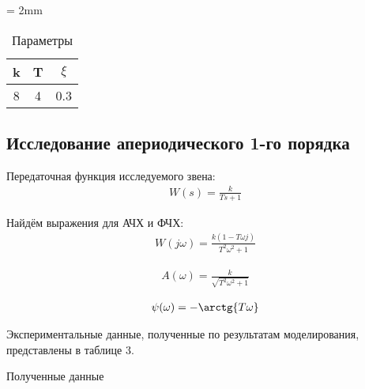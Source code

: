 \documentclass[a4paper, 12pt]{article}
\begin{document}
\begin{table}[h!]
    \tabulinesep = 2mm
    \centering
    \begin{threeparttable}
    	\caption{Параметры}\label{tab:perflogcross}
    	\begin{tabular}{|c|c|c|}
    		\hline
        	k & T & $\xi$ \\ \hline
        	8 & 4 & 0.3 \\
        	\hline
    	\end{tabular}
    \end{threeparttable} 
\end{table}

\newpage
\begin{center}
	\section{Исследование апериодического 1-го порядка}
\end{center}

\par 
Передаточная функция исследуемого звена:
\begin{align}
	W(s)=\frac{k}{Ts+1}
\end{align}
\par 
Найдём выражения для АЧХ и ФЧХ:
\begin{align}
W(j\omega) = \frac{k(1-T\omega j)}{T^2\omega^2 + 1}
\end{align}

\begin{align}
	A(\omega) = \frac{k}{\sqrt{T^2\omega^2 + 1}}
\end{align}
	
\begin{align}
	\psi(\omega) =-\arctg{T\omega}
\end{align}

\par 
Экспериментальные данные, полученные по результатам моделирования, представлены в таблице 3.
\begin{table}[h!]
    \centering
    \begin{threeparttable}
        \caption{Полученные данные} \label{tab:perflogcross}
    \end{threeparttable}
\end{table}
\end{document}
